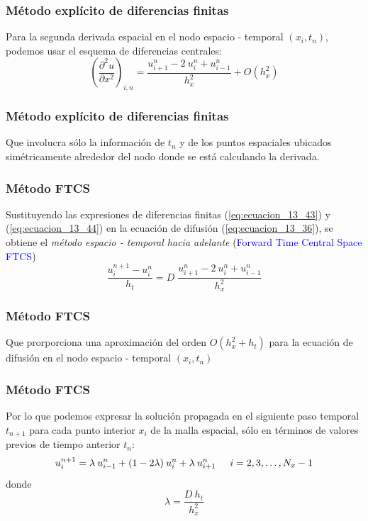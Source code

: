 \documentclass[12pt]{beamer}
\begin{document}
\begin{frame}
\frametitle{Método explícito de diferencias finitas}	
Para la segunda derivada espacial en el nodo espacio - temporal $(x_{i}, t_{n})$, podemos usar el esquema de diferencias centrales:
\begin{equation}
\left( \dfrac{\partial^{2} u}{\partial x^{2}} \right)_{i,n} = \dfrac{u_{i + 1}^{n} - 2 \: u_{i}^{n} + u_{i - 1}^{n}}{h_{x}^{2}} + O(h_{x}^{2})
\label{eq:ecuacion_13_44}
\end{equation}
\end{frame}
\begin{frame}
\frametitle{Método explícito de diferencias finitas}
Que involucra sólo la información de $t_{n}$ y de los puntos espaciales ubicados simétricamente alrededor del nodo donde se está calculando la derivada.
\end{frame}
\begin{frame}
\frametitle{Método FTCS}
Sustituyendo las expresiones de diferencias finitas (\ref{eq:ecuacion_13_43}) y (\ref{eq:ecuacion_13_44}) en la ecuación de difusión (\ref{eq:ecuacion_13_36}), se obtiene el \emph{método espacio - temporal hacia adelante} (\textcolor{blue}{Forward Time Central Space FTCS})
\begin{equation}
\dfrac{u_{i}^{n + 1} - u_{i}^{n}}{h_{t}} =  D \; \dfrac{u_{i + 1}^{n} - 2 \: u_{i}^{n} + u_{i - 1}^{n}}{h_{x}^{2}}
\label{eq:ecuacion_13_45}
\end{equation}
\end{frame}
\begin{frame}
\frametitle{Método FTCS}
Que prorporciona una aproximación del orden $O(h_{x}^{2} + h_{t})$ para la ecuación de difusión en el nodo espacio - temporal $(x_{i}, t_{n})$
\end{frame}
\begin{frame}
\frametitle{Método FTCS}
Por lo que podemos expresar la solución propagada en el siguiente paso temporal $t_{n + 1}$ para cada punto interior $x_{i}$ de la malla espacial, sólo en términos de valores previos de tiempo anterior $t_{n}$:
\begin{equation}
u_{i}^{n + 1} = \lambda \: u_{i - 1}^{n} + (1 - 2 \lambda) \: u_{i}^{n} + \lambda \: u_{i + 1}^{n} \hspace{0.5cm} i = 2, 3, \ldots, N_{x} -1
\label{eq:ecuacion_13_46}
\end{equation}
donde
\begin{equation}
\lambda = \dfrac{D \: h_{t}}{h_{x}^{2}}
\label{eq:ecuacion_13_47}
\end{equation}
\end{frame}
\end{document}
